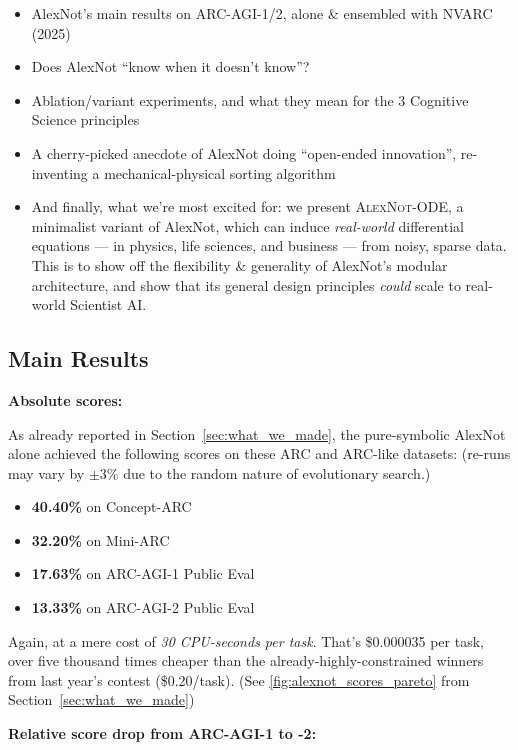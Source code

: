 \documentclass[11pt]{article}
\begin{document}
\begin{itemize}
    \item AlexNot's main results on ARC-AGI-1/2, alone \& ensembled with NVARC (2025)
\item Does AlexNot ``know when it doesn't know''?
\item Ablation/variant experiments, and what they mean for the 3 Cognitive Science principles
\item A cherry-picked anecdote of AlexNot doing ``open-ended innovation'', re-inventing a mechanical-physical sorting algorithm
\item And finally, what we're most excited for: we present \textsc{AlexNot-ODE}, a minimalist variant of AlexNot, which can induce \textit{real-world} differential equations — in physics, life sciences, and business — from noisy, sparse data. This is to show off the flexibility \& generality of AlexNot's modular architecture, and show that its general design principles \textit{could} scale to real-world Scientist AI.
\end{itemize}

\subsection{Main Results}\label{sec:main_results}

\textbf{Absolute scores:}

As already reported in Section~\ref{sec:what_we_made}, the pure-symbolic AlexNot alone achieved the following scores on these ARC and ARC-like datasets: (re-runs may vary by $\pm3$\% due to the random nature of evolutionary search.)

\begin{itemize}
    \item \textbf{40.40\%} on Concept-ARC \citep{concept_arc}
    \item \textbf{32.20\%} on Mini-ARC \citep{mini_arc}
    \item \textbf{17.63\%} on ARC-AGI-1 Public Eval
    \item \textbf{13.33\%} on ARC-AGI-2 Public Eval
\end{itemize}

Again, at a mere cost of \textit{30 CPU-seconds per task}. That's \$0.000035 per task, over five thousand times cheaper than the already-highly-constrained winners from last year's contest (\$0.20/task). (See \autoref{fig:alexnot_scores_pareto} from Section~\ref{sec:what_we_made})

\textbf{Relative score drop from ARC-AGI-1 to -2:}
\end{document}
